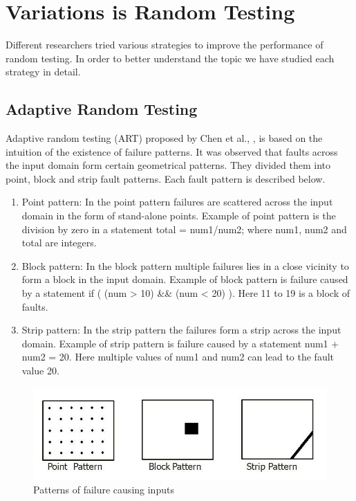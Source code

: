 \section{Variations is Random Testing}
Different researchers tried various strategies to improve the performance of random testing. In order to better understand the topic we have studied each strategy in detail.

\subsection{Adaptive Random Testing}
Adaptive random testing (ART) proposed by Chen et al., \cite{??}, is based on the intuition of the existence of failure patterns. It was observed that faults across the input domain form certain geometrical patterns. They divided them into point, block and strip fault patterns. Each fault pattern is described below.

\begin{enumerate}
\item Point pattern: In the point pattern failures are scattered across the input domain in the form of stand-alone points. Example of point pattern is the division by zero in a statement total = num1/num2; where num1, num2 and total are integers. 
\item Block pattern: In the block pattern multiple failures lies in a close vicinity to form a block in the input domain. Example of block pattern is failure caused by a statement if ( (num > 10) \&\& (num < 20) ). Here 11 to 19 is a block of faults.
\item Strip pattern: In the strip pattern the failures form a strip across the input domain. Example of strip pattern is failure caused by a statement num1 + num2 = 20. Here multiple values of num1 and num2 can lead to the fault value 20.
\end{enumerate}

\begin{figure}[h]
	\centering
	\includegraphics[scale=0.5]{Literature/pointblockstrip}
	\caption{Patterns of failure causing inputs}
	\label{patterns}
\end{figure}

